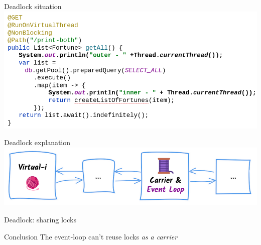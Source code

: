 \documentclass{beamer}
\begin{document}
\begin{frame}{Deadlock situation}
    \includegraphics[width=\textwidth]{assets/deadlock.png}
\end{frame}
\begin{frame}{Deadlock explanation}
    \includegraphics[width=\textwidth]{assets/deadlock_situation.png}
\end{frame}
\begin{frame}{Deadlock: sharing locks}
    \begin{alertblock}{Conclusion}
        The event-loop can't reuse locks \emph{as a carrier}
    \end{alertblock}
\end{frame}
\end{document}
